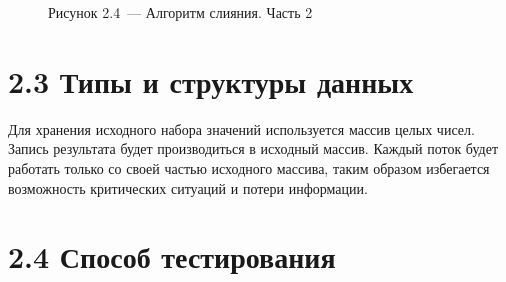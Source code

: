\documentclass[12pt, a4paper]{report}
\begin{document}
\begin{figure}[H]
\caption*{Рисунок 2.4~--- Алгоритм слияния. Часть 2}
\end{figure}

\section*{2.3 Типы и структуры данных}

Для хранения исходного набора значений используется массив целых чисел. Запись результата будет производиться в исходный массив. Каждый поток будет работать только со своей частью исходного массива, таким образом избегается возможность критических ситуаций и потери информации.

\section*{2.4 Способ тестирования}
\end{document}
